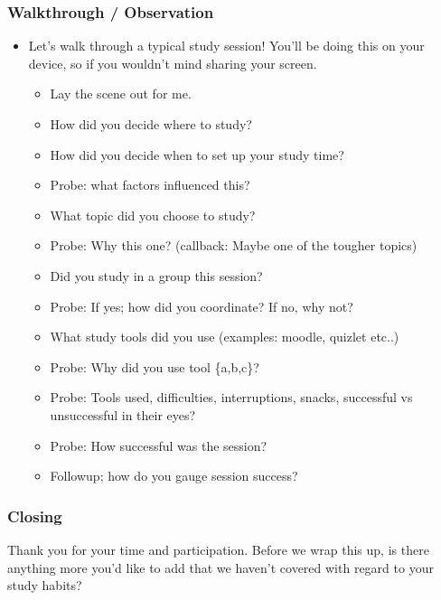 \documentclass[a4paper,11pt]{article}
\begin{document}
\subsubsection*{Walkthrough / Observation}
\begin{itemize}
    \item Let's walk through a typical study session! You'll be doing this on your device, so if you wouldn't mind sharing your screen.
    \begin{itemize}
        \item Lay the scene out for me.
        \item How did you decide where to study?
        \item How did you decide when to set up your study time?
        \item Probe: what factors influenced this?
        \item What topic did you choose to study?
        \item Probe: Why this one? (callback: Maybe one of the tougher topics)
        \item Did you study in a group this session?
        \item Probe: If yes; how did you coordinate? If no, why not?
        \item What study tools did you use (examples: moodle, quizlet etc..)
        \item Probe: Why did you use tool \{a,b,c\}?
        \item Probe: Tools used, difficulties, interruptions, snacks, successful vs unsuccessful in their eyes?
        \item Probe: How successful was the session? 
        \item Followup; how do you gauge session success?
    \end{itemize}
\end{itemize}

\subsubsection*{Closing}
Thank you for your time and participation. Before we wrap this up, is there anything more you'd like to add that we haven't covered with regard to your study habits?


\newpage
\printbibliography[heading=bibintoc]
\end{document}
